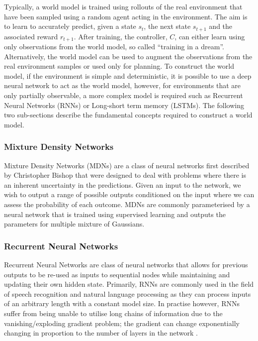 Typically, a world model is trained using rollouts of the real environment that have been sampled using a random agent acting in the environment. The aim is to learn to accurately predict, given a state $s_t$, the next state $s_{t+1}$ and the associated reward $r_{t+1}$. After training, the controller, $C$, can either learn using only observations from the world model, so called ``training in a dream''. Alternatively, the world model can be used to augment the observations from the real environment samples or used only for planning. To construct the world model, if the environment is simple and deterministic, it is possible to use a deep neural network to act as the world model, however, for environments that are only partially observable, a more complex model is required such as Recurrent Neural Networks (RNNs) or Long-short term memory (LSTMs). The following two sub-sections describe the fundamental concepts required to construct a world model.

\subsubsection{Mixture Density Networks}
Mixture Density Networks (MDNs) are a class of neural networks first described by Christopher Bishop \cite{bishop1994mixture} that were designed to deal with problems where there is an inherent uncertainty in the predictions. Given an input to the network, we wish to output a range of possible outputs conditioned on the input where we can assess the probability of each outcome. MDNs are commonly parameterised by a neural network that is trained using supervised learning and outputs the parameters for multiple mixture of Gaussians.

\subsubsection{Recurrent Neural Networks}
Recurrent Neural Networks are class of neural networks that allows for previous outputs to be re-used as inputs to sequential nodes while maintaining and updating their own hidden state. Primarily, RNNs are commonly used in the field of speech recognition and natural language processing as they can process inputs of an arbitrary length with a constant model size. In practise however, RNNs suffer from being unable to utilise long chains of information due to the vanishing/exploding gradient problem; the gradient can change exponentially changing in proportion to the number of layers in the network \cite{Hochreiter:01book}.

